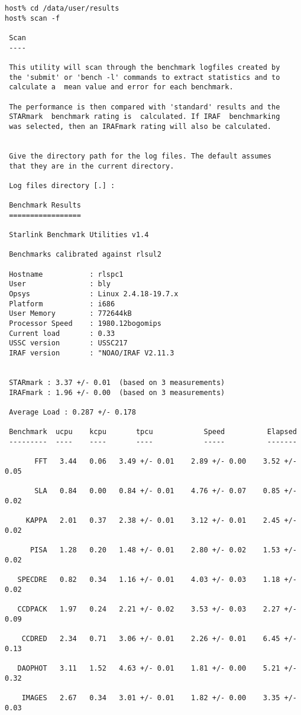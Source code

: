 \begin{verbatim}
host% cd /data/user/results
host% scan -f

 Scan
 ----

 This utility will scan through the benchmark logfiles created by
 the 'submit' or 'bench -l' commands to extract statistics and to
 calculate a  mean value and error for each benchmark.

 The performance is then compared with 'standard' results and the
 STARmark  benchmark rating is  calculated. If IRAF  benchmarking
 was selected, then an IRAFmark rating will also be calculated.


 Give the directory path for the log files. The default assumes
 that they are in the current directory.

 Log files directory [.] :

 Benchmark Results
 =================

 Starlink Benchmark Utilities v1.4

 Benchmarks calibrated against rlsul2

 Hostname           : rlspc1
 User               : bly
 Opsys              : Linux 2.4.18-19.7.x
 Platform           : i686
 User Memory        : 772644kB
 Processor Speed    : 1980.12bogomips
 Current load       : 0.33
 USSC version       : USSC217
 IRAF version       : "NOAO/IRAF V2.11.3


 STARmark : 3.37 +/- 0.01  (based on 3 measurements)
 IRAFmark : 1.96 +/- 0.00  (based on 3 measurements)

 Average Load : 0.287 +/- 0.178

 Benchmark  ucpu    kcpu       tpcu            Speed          Elapsed
 ---------  ----    ----       ----            -----          -------

       FFT   3.44   0.06   3.49 +/- 0.01    2.89 +/- 0.00    3.52 +/- 0.05

       SLA   0.84   0.00   0.84 +/- 0.01    4.76 +/- 0.07    0.85 +/- 0.02

     KAPPA   2.01   0.37   2.38 +/- 0.01    3.12 +/- 0.01    2.45 +/- 0.02

      PISA   1.28   0.20   1.48 +/- 0.01    2.80 +/- 0.02    1.53 +/- 0.02

   SPECDRE   0.82   0.34   1.16 +/- 0.01    4.03 +/- 0.03    1.18 +/- 0.02

   CCDPACK   1.97   0.24   2.21 +/- 0.02    3.53 +/- 0.03    2.27 +/- 0.09

    CCDRED   2.34   0.71   3.06 +/- 0.01    2.26 +/- 0.01    6.45 +/- 0.13

   DAOPHOT   3.11   1.52   4.63 +/- 0.01    1.81 +/- 0.00    5.21 +/- 0.32

    IMAGES   2.67   0.34   3.01 +/- 0.01    1.82 +/- 0.00    3.35 +/- 0.03

\end{verbatim}

